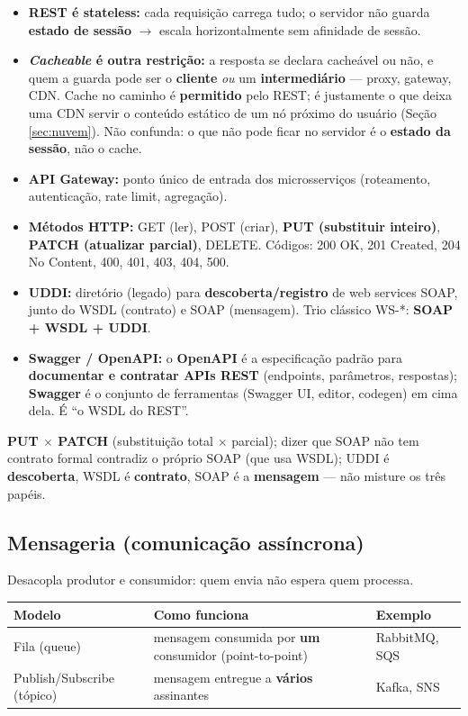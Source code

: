 \begin{itemize}
\item \textbf{REST é stateless:} cada requisição carrega tudo; o servidor
não guarda \textbf{estado de sessão} $\to$ escala horizontalmente sem
afinidade de sessão.
\item \textbf{\emph{Cacheable} é outra restrição:} a resposta se declara
cacheável ou não, e quem a guarda pode ser o \textbf{cliente} \emph{ou} um
\textbf{intermediário} --- proxy, gateway, CDN. Cache no caminho é
\textbf{permitido} pelo REST; é justamente o que deixa uma CDN servir o
conteúdo estático de um nó próximo do usuário (Seção \ref{sec:nuvem}). Não
confunda: o que não pode ficar no servidor é o \textbf{estado da sessão}, não
o cache.
\item \textbf{API Gateway:} ponto único de entrada dos microsserviços
(roteamento, autenticação, rate limit, agregação).
\item \textbf{Métodos HTTP:} GET (ler), POST (criar), \textbf{PUT
(substituir inteiro)}, \textbf{PATCH (atualizar parcial)}, DELETE. Códigos:
200 OK, 201 Created, 204 No Content, 400, 401, 403, 404, 500.
\item \textbf{UDDI:} diretório (legado) para \textbf{descoberta/registro} de
web services SOAP, junto do WSDL (contrato) e SOAP (mensagem). Trio clássico
WS-*: \textbf{SOAP + WSDL + UDDI}.
\item \textbf{Swagger / OpenAPI:} o \textbf{OpenAPI} é a especificação
padrão para \textbf{documentar e contratar APIs REST} (endpoints,
parâmetros, respostas); \textbf{Swagger} é o conjunto de ferramentas (Swagger
UI, editor, codegen) em cima dela. É ``o WSDL do REST''.
\end{itemize}

\begin{pegadinha}
\textbf{PUT $\times$ PATCH} (substituição total $\times$ parcial); dizer que
SOAP não tem contrato formal contradiz o próprio SOAP (que usa WSDL); UDDI é
\textbf{descoberta}, WSDL é \textbf{contrato}, SOAP é a \textbf{mensagem} ---
não misture os três papéis.
\end{pegadinha}

\subsection{Mensageria (comunicação assíncrona)}

Desacopla produtor e consumidor: quem envia não espera quem processa.

\begin{center}
\begin{tabular}{@{}p{3.2cm}p{4.6cm}p{3cm}@{}}
\toprule
\textbf{Modelo} & \textbf{Como funciona} & \textbf{Exemplo} \\
\midrule
Fila (queue) & mensagem consumida por \textbf{um} consumidor (point-to-point) & RabbitMQ, SQS \\
Publish/Subscribe (tópico) & mensagem entregue a \textbf{vários} assinantes & Kafka, SNS \\
\bottomrule
\end{tabular}
\end{center}

